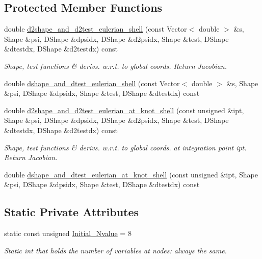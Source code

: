 \subsection*{Protected Member Functions}
\begin{DoxyCompactItemize}
\item 
double \hyperlink{classoomph_1_1BellShellElement_ace76c40d2ccff50c50140cb27ef9e6f6}{d2shape\+\_\+and\+\_\+d2test\+\_\+eulerian\+\_\+shell} (const Vector$<$ double $>$ \&s, Shape \&psi, D\+Shape \&dpsidx, D\+Shape \&d2psidx, Shape \&test, D\+Shape \&dtestdx, D\+Shape \&d2testdx) const
\begin{DoxyCompactList}\small\item\em Shape, test functions \& derivs. w.\+r.\+t. to global coords. Return Jacobian. \end{DoxyCompactList}\item 
double \hyperlink{classoomph_1_1BellShellElement_aab519c12f08b5a723d6eab3e1a0a3e84}{dshape\+\_\+and\+\_\+dtest\+\_\+eulerian\+\_\+shell} (const Vector$<$ double $>$ \&s, Shape \&psi, D\+Shape \&dpsidx, Shape \&test, D\+Shape \&dtestdx) const
\item 
double \hyperlink{classoomph_1_1BellShellElement_a00932feabc5283a7edbff0cf8c52eb67}{d2shape\+\_\+and\+\_\+d2test\+\_\+eulerian\+\_\+at\+\_\+knot\+\_\+shell} (const unsigned \&ipt, Shape \&psi, D\+Shape \&dpsidx, D\+Shape \&d2psidx, Shape \&test, D\+Shape \&dtestdx, D\+Shape \&d2testdx) const
\begin{DoxyCompactList}\small\item\em Shape, test functions \& derivs. w.\+r.\+t. to global coords. at integration point ipt. Return Jacobian. \end{DoxyCompactList}\item 
double \hyperlink{classoomph_1_1BellShellElement_a56fcbf1446e8797e3066c802140d5baf}{dshape\+\_\+and\+\_\+dtest\+\_\+eulerian\+\_\+at\+\_\+knot\+\_\+shell} (const unsigned \&ipt, Shape \&psi, D\+Shape \&dpsidx, Shape \&test, D\+Shape \&dtestdx) const
\end{DoxyCompactItemize}
\subsection*{Static Private Attributes}
\begin{DoxyCompactItemize}
\item 
static const unsigned \hyperlink{classoomph_1_1BellShellElement_a85143ad34e170cb267211069ee7e334f}{Initial\+\_\+\+Nvalue} = 8
\begin{DoxyCompactList}\small\item\em Static int that holds the number of variables at nodes\+: always the same. \end{DoxyCompactList}\end{DoxyCompactItemize}
